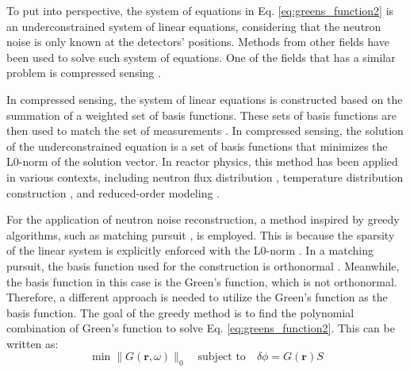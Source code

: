 To put into perspective, the system of equations in Eq. \ref{eq:greens_function2} is an underconstrained system of linear equations, considering that the neutron noise is only known at the detectors’ positions. Methods from other fields have been used to solve such system of equations. One of the fields that has a similar problem is compressed sensing \cite{donohoCompressedSensing2006}. 

In compressed sensing, the system of linear equations is constructed based on the summation of a weighted set of basis functions. These sets of basis functions are then used to match the set of measurements  \cite{priceSimplifiedMatchingPursuits2024}. In compressed sensing, the solution of the underconstrained equation is a set of basis functions that minimizes the L0-norm of the solution vector. In reactor physics, this method has been applied in various contexts, including neutron flux distribution \cite{bahugunaSignalRecoverySparse2017, bahugunaCompressedSensingArtificial2018}, temperature distribution construction \cite{priceSimplifiedMatchingPursuits2024}, and reduced-order modeling \cite{gongDataEnabledPhysicsInformedMachine2022}.

For the application of neutron noise reconstruction, a method inspired by greedy algorithms, such as matching pursuit \cite{mallatMatchingPursuitsTimefrequency1993}, is employed. This is because the sparsity of the linear system is explicitly enforced with the L0-norm \cite{priceSimplifiedMatchingPursuits2024}. In a matching pursuit, the basis function used for the construction is orthonormal \cite{mallatMatchingPursuitsTimefrequency1993}. Meanwhile, the basis function in this case is the Green's function, which is not orthonormal. Therefore, a different approach is needed to utilize the Green's function as the basis function. The goal of the greedy method is to find the polynomial combination of Green's function to solve Eq. \ref{eq:greens_function2}. This can be written as:
\begin{equation}
    \min \| G(\textbf{r},\omega) \|_0 \quad \text{subject to} \quad \delta \phi = G(\textbf{r}) S 
\end{equation}

